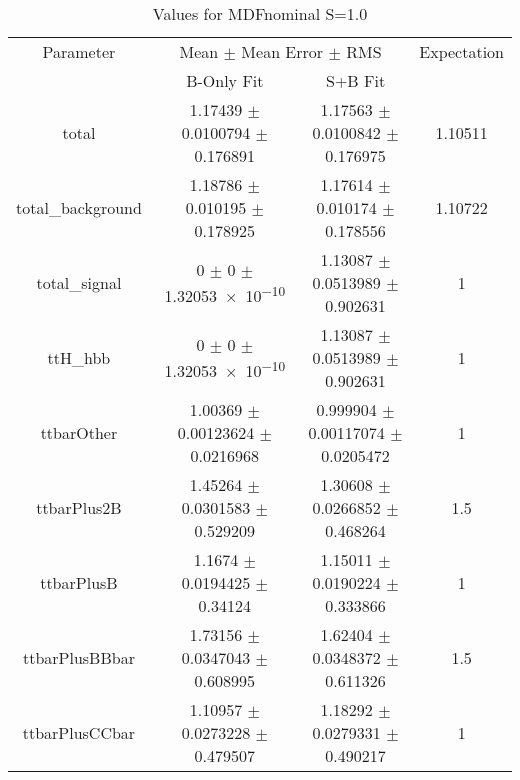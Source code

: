 \begin{table}
\centering
\caption{Values for MDFnominal S=1.0}
\begin{tabular}{cccc}
\toprule
Parameter & \multicolumn{2}{c}{Mean $\pm$ Mean Error $\pm$ RMS} & Expectation\\
 & B-Only Fit & S+B Fit & \\
\midrule
total & \num{1.17439} $\pm$ \num{0.0100794} $\pm$ \num{0.176891} & \num{1.17563} $\pm$ \num{0.0100842} $\pm$ \num{0.176975} & \num{1.10511}\\
total\_background & \num{1.18786} $\pm$ \num{0.010195} $\pm$ \num{0.178925} & \num{1.17614} $\pm$ \num{0.010174} $\pm$ \num{0.178556} & \num{1.10722}\\
total\_signal & \num{0} $\pm$ \num{0} $\pm$ \num{1.32053e-10} & \num{1.13087} $\pm$ \num{0.0513989} $\pm$ \num{0.902631} & \num{1}\\
ttH\_hbb & \num{0} $\pm$ \num{0} $\pm$ \num{1.32053e-10} & \num{1.13087} $\pm$ \num{0.0513989} $\pm$ \num{0.902631} & \num{1}\\
ttbarOther & \num{1.00369} $\pm$ \num{0.00123624} $\pm$ \num{0.0216968} & \num{0.999904} $\pm$ \num{0.00117074} $\pm$ \num{0.0205472} & \num{1}\\
ttbarPlus2B & \num{1.45264} $\pm$ \num{0.0301583} $\pm$ \num{0.529209} & \num{1.30608} $\pm$ \num{0.0266852} $\pm$ \num{0.468264} & \num{1.5}\\
ttbarPlusB & \num{1.1674} $\pm$ \num{0.0194425} $\pm$ \num{0.34124} & \num{1.15011} $\pm$ \num{0.0190224} $\pm$ \num{0.333866} & \num{1}\\
ttbarPlusBBbar & \num{1.73156} $\pm$ \num{0.0347043} $\pm$ \num{0.608995} & \num{1.62404} $\pm$ \num{0.0348372} $\pm$ \num{0.611326} & \num{1.5}\\
ttbarPlusCCbar & \num{1.10957} $\pm$ \num{0.0273228} $\pm$ \num{0.479507} & \num{1.18292} $\pm$ \num{0.0279331} $\pm$ \num{0.490217} & \num{1}\\
\bottomrule
\end{tabular}
\end{table}